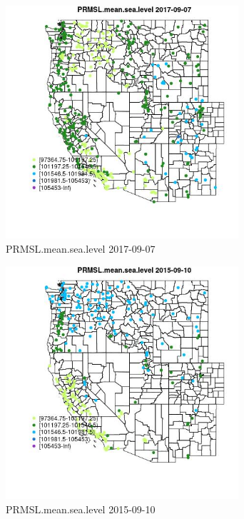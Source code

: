 \begin{figure} 
\centering  
\includegraphics[width=0.77\textwidth]{Code_Outputs/Report_ML_input_PM25_Step4_part_e_de_duplicated_aves_compiled_2019-05-21wNAs_MapObsPRMSLmeansealevel2017-09-07.jpg} 
\caption{\label{fig:Report_ML_input_PM25_Step4_part_e_de_duplicated_aves_compiled_2019-05-21wNAsMapObsPRMSLmeansealevel2017-09-07}PRMSL.mean.sea.level 2017-09-07} 
\end{figure} 
 

\clearpage 

\begin{figure} 
\centering  
\includegraphics[width=0.77\textwidth]{Code_Outputs/Report_ML_input_PM25_Step4_part_e_de_duplicated_aves_compiled_2019-05-21wNAs_MapObsPRMSLmeansealevel2015-09-10.jpg} 
\caption{\label{fig:Report_ML_input_PM25_Step4_part_e_de_duplicated_aves_compiled_2019-05-21wNAsMapObsPRMSLmeansealevel2015-09-10}PRMSL.mean.sea.level 2015-09-10} 
\end{figure} 
 

